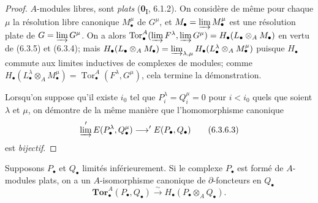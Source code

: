 \begin{proof}
$A$-modules libres, sont \emph{plats} (\textbf{0}\textsubscript{I}, 6.1.2). On considère de
même pour chaque $\mu$ la résolution libre canonique $M_\bullet^\mu$ de
$G^\mu$, et $M_\bullet=\varinjlim M_\bullet^\mu$ est une résolution plate
de $G=\varinjlim G^\mu$. On a alors
$\operatorname{Tor}_\bullet^A(\varinjlim F^\lambda,
\varinjlim G^\mu)=H_\bullet(L_\bullet\otimes_A M_\bullet)$ en vertu de
(6.3.5) et (6.3.4); mais
$H_\bullet(L_\bullet\otimes_A M_\bullet)
=\varinjlim_{\lambda,\mu}
H_\bullet(L_\bullet^\lambda\otimes_A M_\bullet^\mu)$
puisque $H_\bullet$ commute aux limites inductives de complexes de modules;
comme $H_\bullet(L_\bullet^\lambda\otimes_A M_\bullet^\mu)
=\operatorname{Tor}_\bullet^A(F^\lambda,G^\mu)$, cela termine la
démonstration.

Lorsqu'on suppose qu'il existe $i_0$ tel que
$P_i^\lambda=Q_i^\mu=0$ pour $i<i_0$ quels que soient $\lambda$ et $\mu$, on
démontre de la même manière que l'homomorphisme canonique
\[
  \varinjlim'E(P_\bullet^\lambda,Q_\bullet^\mu)
  \longrightarrow'E(P_\bullet,Q_\bullet)
  \tag{6.3.6.3}\label{III.6.3.6.3.fr}
\]
est \emph{bijectif}.
\end{proof}

\begin{proposition}[6.3.7]
Supposons $P_\bullet$ et $Q_\bullet$ limités inférieurement. Si le complexe
$P_\bullet$ est formé de $A$-modules plats, on a un $A$-isomorphisme
canonique de $\partial$-foncteurs en $Q_\bullet$
\[
  \mathbf{Tor}_\bullet^A(P_\bullet,Q_\bullet)
  \xrightarrow{\sim}H_\bullet(P_\bullet\otimes_A Q_\bullet).
  \tag{6.3.7.1}\label{III.6.3.7.1.fr}
\]
\end{proposition}

